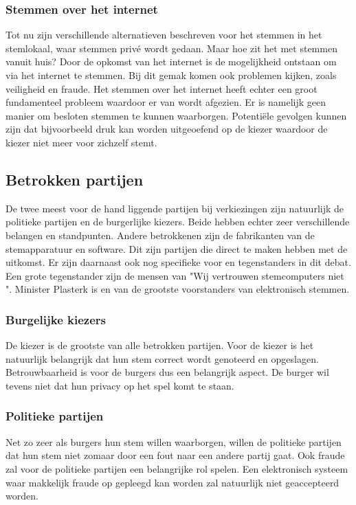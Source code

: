 \documentclass[a4paper]{article}
\begin{document}
\subsubsection{Stemmen over het internet}
Tot nu zijn verschillende alternatieven beschreven voor het stemmen in het stemlokaal, waar stemmen priv{\'e} wordt gedaan. 
Maar hoe zit het met stemmen vanuit huis?
Door de opkomst van het internet is de mogelijkheid ontstaan om via het internet te stemmen.
Bij dit gemak komen ook problemen kijken, zoals veiligheid en fraude. 
Het stemmen over het internet heeft echter een groot fundamenteel probleem waardoor er van wordt afgezien.
Er is namelijk geen manier om besloten stemmen te kunnen waarborgen.
Potenti{\"e}le gevolgen kunnen zijn dat bijvoorbeeld druk kan worden uitgeoefend op de kiezer waardoor de kiezer niet meer voor zichzelf stemt.

\subsection{Betrokken partijen}

De twee meest voor de hand liggende partijen bij verkiezingen zijn natuurlijk de politieke partijen en de burgerlijke kiezers. 
Beide hebben echter zeer verschillende belangen en standpunten. 
Andere betrokkenen zijn de fabrikanten van de stemapparatuur en software.
Dit zijn partijen die direct te maken hebben met de uitkomst.
Er zijn daarnaast ook nog specifieke voor en tegenstanders in dit debat.
Een grote tegenstander zijn de mensen van "Wij vertrouwen stemcomputers niet ".
Minister Plasterk is en van de grootste voorstanders van elektronisch stemmen.
 
\subsubsection{Burgelijke kiezers}
De kiezer is de grootste van alle betrokken partijen.
Voor de kiezer is het natuurlijk belangrijk dat hun stem correct wordt genoteerd en opgeslagen. 
Betrouwbaarheid is voor de burgers dus een belangrijk aspect.
De burger wil tevens niet dat hun privacy op het spel komt te staan.
 
\subsubsection{Politieke partijen}
Net zo zeer als burgers hun stem willen waarborgen, willen de politieke partijen dat hun stem niet zomaar door een fout naar een andere partij gaat.
Ook fraude zal voor de politieke partijen een belangrijke rol spelen. 
Een elektronisch systeem waar makkelijk fraude op gepleegd kan worden zal natuurlijk niet geaccepteerd worden.
\end{document}
